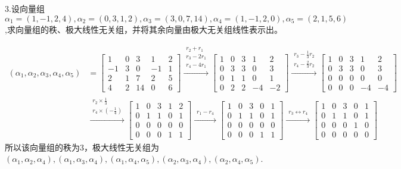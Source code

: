 \documentclass{article}
\begin{document}
3.设向量组$\alpha_{1}=(1,-1,2,4),\alpha_{2}=(0,3,1,2),\alpha_{3}=(3,0,7,14),\alpha_{4}=(1,-1,2,0),\alpha_{5}=(2,1,5,6)$,求向量组的秩、极大线性无关组，并将其余向量由极大无关组线性表示出。

\begin{jie}
\begin{align*}
(\alpha_1,\alpha_2,\alpha_3,\alpha_4,\alpha_5)&=
\begin{bmatrix}
  1 & 0 & 3 &1 &2\\
  -1 & 3 & 0&-1&1\\
  2 & 1 & 7&2&5\\
  4 & 2 &14&0&6
\end{bmatrix}
\xrightarrow{\substack{r_{2}+r_{1}\\ r_3-2r_1 \\ r_4-4r_1}}
{
\begin{bmatrix}
  1 & 0 & 3 &1&2\\
  0 & 3 & 3&0&3\\
  0 & 1 & 1&0&1\\
  0 & 2 &2&-4&-2
\end{bmatrix}
}
\xrightarrow{\substack{ r_3-\frac{1}{3}r_2 \\ r_4-\frac{2}{3}r_2}}
{
\begin{bmatrix}
  1 & 0 & 3 &1&2\\
  0 & 3 & 3&0&3\\
  0 & 0 & 0&0&0\\
  0 & 0 &0&-4&-4
\end{bmatrix}
}\\
&
\xrightarrow{\substack{ r_2\times\frac{1}{3} \\ r_4\times\left(-\frac{1}{4}\right)}}
{
\begin{bmatrix}
  1 & 0 & 3 &1&2\\
  0 & 1 & 1&0&1\\
  0 & 0 & 0&0&0\\
  0 & 0 &0&1&1
\end{bmatrix}
}
\xrightarrow{\substack{ r_1-r_4}}
{
\begin{bmatrix}
  1 & 0 & 3 &0&1\\
  0 & 1 & 1&0&1\\
  0 & 0 & 0&0&0\\
  0 & 0 &0&1&1
\end{bmatrix}
}
\xrightarrow{\substack{ r_3\leftrightarrow r_4}}
{
\begin{bmatrix}
  1 & 0 & 3 &0&1\\
  0 & 1 & 1&0&1\\
  0 & 0 & 0&1& 0\\
  0 & 0 &0&0& 0
\end{bmatrix}
}
\end{align*}
所以该向量组的秩为$3$，极大线性无关组为$(\alpha_1,\alpha_2,\alpha_4),(\alpha_1,\alpha_3,\alpha_4),(\alpha_1,\alpha_4,\alpha_5),(\alpha_2,\alpha_3,\alpha_4),(\alpha_2,\alpha_4,\alpha_5)$.


\end{jie}
\end{document}
